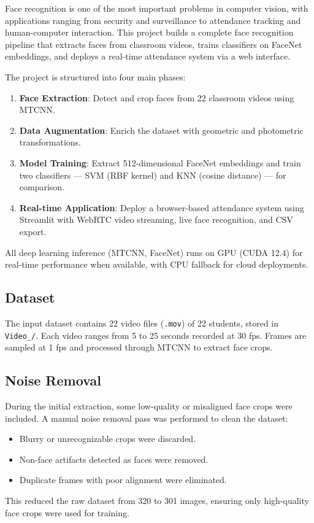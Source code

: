 \documentclass[12pt,a4paper]{article}
\begin{document}
Face recognition is one of the most important problems in computer vision, with applications ranging from security and surveillance to attendance tracking and human-computer interaction. This project builds a complete face recognition pipeline that extracts faces from classroom videos, trains classifiers on FaceNet embeddings, and deploys a real-time attendance system via a web interface.

The project is structured into four main phases:
\begin{enumerate}
    \item \textbf{Face Extraction}: Detect and crop faces from 22 classroom videos using MTCNN.
    \item \textbf{Data Augmentation}: Enrich the dataset with geometric and photometric transformations.
    \item \textbf{Model Training}: Extract 512-dimensional FaceNet embeddings and train two classifiers --- SVM (RBF kernel) and KNN (cosine distance) --- for comparison.
    \item \textbf{Real-time Application}: Deploy a browser-based attendance system using Streamlit with WebRTC video streaming, live face recognition, and CSV export.
\end{enumerate}

All deep learning inference (MTCNN, FaceNet) runs on GPU (CUDA 12.4) for real-time performance when available, with CPU fallback for cloud deployments.

\subsection{Dataset}
\label{subsec:data}

The input dataset contains 22 video files (\texttt{.mov}) of 22 students, stored in \texttt{Video\_/}. Each video ranges from 5 to 25 seconds recorded at 30 fps. Frames are sampled at 1 fps and processed through MTCNN to extract face crops.

\subsection{Noise Removal}
\label{subsec:noise}

During the initial extraction, some low-quality or misaligned face crops were included. A manual noise removal pass was performed to clean the dataset:
\begin{itemize}
    \item Blurry or unrecognizable crops were discarded.
    \item Non-face artifacts detected as faces were removed.
    \item Duplicate frames with poor alignment were eliminated.
\end{itemize}
This reduced the raw dataset from 320 to 301 images, ensuring only high-quality face crops were used for training.
\end{document}
